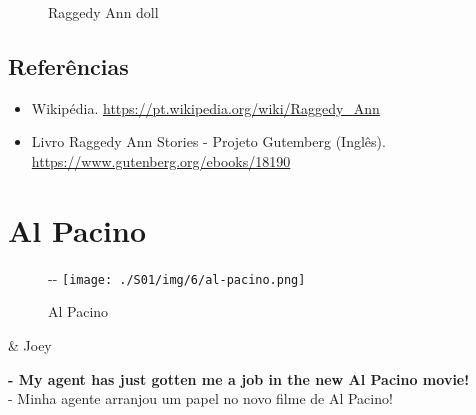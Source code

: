 \begin{figure}
  \centering
    \caption{Raggedy Ann doll\label{fig:raggedy-ann-doll}}
\end{figure}

\hypertarget{referuxeancias-2}{%
\subsection{Referências}\label{referuxeancias-2}}

\begin{itemize}
\tightlist
\item
  \sloppy Wikipédia. \url{https://pt.wikipedia.org/wiki/Raggedy_Ann}
\item
  \sloppy Livro Raggedy Ann Stories - Projeto Gutemberg (Inglês). \url{https://www.gutenberg.org/ebooks/18190}
\end{itemize}

\hypertarget{al-pacino}{%
\section{Al Pacino}\label{al-pacino}}

\begin{figure}[!ht]
  \begin{adjustwidth}{-\oddsidemargin-1in}{-\rightmargin}
    \centering
    \texttt{[image: ./S01/img/6/al-pacino.png]}
    \caption{Al Pacino\label{fig:al-pacino}}
  \end{adjustwidth}
\end{figure}

\begin{tcolorbox}[enhanced,center upper,
    drop fuzzy shadow southeast, boxrule=0.3pt,
    lower separated=false,
    colframe=black!30!dialogoBorder,colback=white]
\begin{minipage}[c]{0.14\linewidth}
   & \centering \scriptsize{Joey}
\end{minipage}
\hspace{.1mm}
\begin{minipage}[c]{0.8\linewidth}
  \textbf{- My agent has just gotten me a job in the new Al Pacino movie!}\\
  - Minha agente arranjou um papel no novo filme de Al Pacino!
\end{minipage}
\end{tcolorbox}

